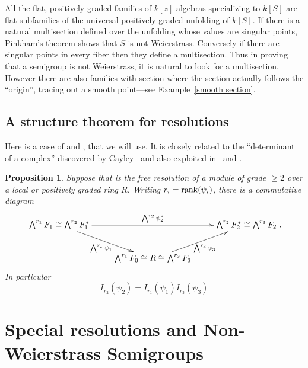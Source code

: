 \documentclass[twoside,12pt, leqno]{amsart}
\DeclareMathOperator{\rank}{{\rm rank}}
\newtheorem{proposition}[theorem]{Proposition}
\theoremstyle{definition}
\begin{document}
All the flat, positively graded families of $k[z]$-algebras specializing to $k[S]$ are flat subfamilies
of the universal positively graded unfolding of $k[S]$. If there is a natural multisection
defined over the unfolding whose values are singular points, Pinkham's theorem
shows that $S$ is not Weierstrass. Conversely if there are singular points in every fiber then they define a multisection. Thus in proving that a semigroup is not Weierstrass, it is natural to look for a multisection. However there are also families with section where the section actually follows
the ``origin'', tracing out a smooth point---see Example~\ref{smooth section}.

\subsection{A structure theorem for resolutions}

Here is a case of  \cite[Theorem 3.1]{MR340240} and \cite{Bruns}, that we will use. It is closely related to the ``determinant of a complex'' discovered by Cayley~\cite{Cayley} and also exploited in~\cite{KnudsonMumford} and \cite{MacRae}.

\begin{proposition}\label{BE}
 Suppose that 
 is the free resolution of a module of grade $\geq 2$ over
 a local or positively graded ring $R$.  Writing $r_{i} = \rank (\psi_{i})$,
  there is a commutative diagram
 $$
\xymatrix{
 \bigwedge^{r_{1}}F_{1} \cong \bigwedge^{r_{2}} F_{1}^{*} 
\ar[rr]^{\bigwedge^{r_{2}} \psi_{2}^{*}} \ar[rd]_{\bigwedge^{r_{1}}\psi_{1}} && \bigwedge^{r_{2}} F_{2}^{*} \cong \bigwedge^{r_{3}}F_{2}\cr
 &\bigwedge^{r_{1}}F_{0}\cong R \cong \bigwedge^{r_{3}}F_{3}\ar[ru]_{\bigwedge^{r_{3}}\psi_{3}}& \cr
} .
$$
In particular 
$$
I_{r_{2}}(\psi_{2}) = I_{r_{1}}(\psi_{1})I_{r_{3}}(\psi_{3})
$$
\end{proposition}
 
 
\section{Special resolutions and Non-Weierstrass Semigroups}
\end{document}

